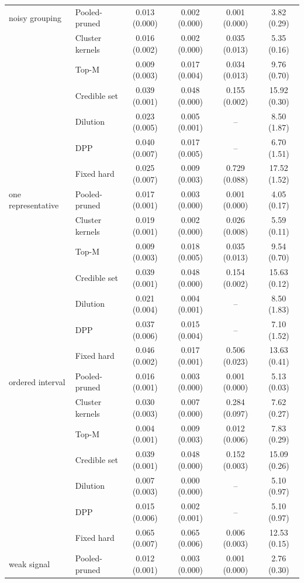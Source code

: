 \begin{tabular}{llcccc}
\addlinespace
noisy grouping & Pooled-pruned & 0.013 (0.000) & 0.002 (0.000) & 0.001 (0.000) & 3.82 (0.29) \\
 & Cluster kernels & 0.016 (0.002) & 0.002 (0.000) & 0.035 (0.013) & 5.35 (0.16) \\
 & Top-M & 0.009 (0.003) & 0.017 (0.004) & 0.034 (0.013) & 9.76 (0.70) \\
 & Credible set & 0.039 (0.001) & 0.048 (0.000) & 0.155 (0.002) & 15.92 (0.30) \\
 & Dilution & 0.023 (0.005) & 0.005 (0.001) & -- & 8.50 (1.87) \\
 & DPP & 0.040 (0.007) & 0.017 (0.005) & -- & 6.70 (1.51) \\
 & Fixed hard & 0.025 (0.007) & 0.009 (0.003) & 0.729 (0.088) & 17.52 (1.52) \\
\addlinespace
one representative & Pooled-pruned & 0.017 (0.001) & 0.003 (0.000) & 0.001 (0.000) & 4.05 (0.17) \\
 & Cluster kernels & 0.019 (0.001) & 0.002 (0.000) & 0.026 (0.008) & 5.59 (0.11) \\
 & Top-M & 0.009 (0.003) & 0.018 (0.005) & 0.035 (0.013) & 9.54 (0.70) \\
 & Credible set & 0.039 (0.001) & 0.048 (0.000) & 0.154 (0.002) & 15.63 (0.12) \\
 & Dilution & 0.021 (0.004) & 0.004 (0.001) & -- & 8.50 (1.83) \\
 & DPP & 0.037 (0.006) & 0.015 (0.004) & -- & 7.10 (1.52) \\
 & Fixed hard & 0.046 (0.002) & 0.017 (0.001) & 0.506 (0.023) & 13.63 (0.41) \\
\addlinespace
ordered interval & Pooled-pruned & 0.016 (0.001) & 0.003 (0.000) & 0.001 (0.000) & 5.13 (0.03) \\
 & Cluster kernels & 0.030 (0.003) & 0.007 (0.000) & 0.284 (0.097) & 7.62 (0.27) \\
 & Top-M & 0.004 (0.001) & 0.009 (0.003) & 0.012 (0.006) & 7.83 (0.29) \\
 & Credible set & 0.039 (0.001) & 0.048 (0.000) & 0.152 (0.003) & 15.09 (0.26) \\
 & Dilution & 0.007 (0.003) & 0.000 (0.000) & -- & 5.10 (0.97) \\
 & DPP & 0.015 (0.006) & 0.002 (0.001) & -- & 5.10 (0.97) \\
 & Fixed hard & 0.065 (0.007) & 0.065 (0.006) & 0.006 (0.003) & 12.53 (0.15) \\
\addlinespace
weak signal & Pooled-pruned & 0.012 (0.001) & 0.003 (0.000) & 0.001 (0.000) & 2.76 (0.30) \\

\end{tabular}
